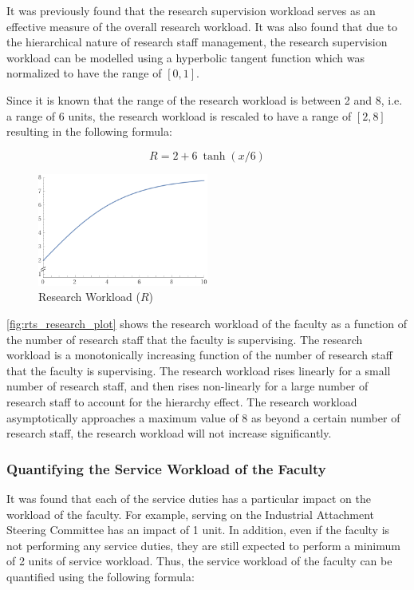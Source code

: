 It was previously found that the research supervision workload serves as an effective measure of the overall research workload. It was also found that due to the hierarchical nature of research staff management, the research supervision workload can be modelled using a hyperbolic tangent function which was normalized to have the range of $[0, 1]$.

Since it is known that the range of the research workload is between 2 and 8, i.e. a range of 6 units, the research workload is rescaled to have a range of $[2, 8]$ resulting in the following formula:

\begin{equation}
  R  = 2 + 6\ \tanh(x/6)
\end{equation}

\begin{figure}[H]
  \includegraphics[width=0.5\textwidth]{images/rts_research_plot.png}
  \centering
  \caption{Research Workload ($R$)}
  \label{fig:rts_research_plot}
\end{figure}

\autoref{fig:rts_research_plot} shows the research workload of the faculty as a function of the number of research staff that the faculty is supervising. The research workload is a monotonically increasing function of the number of research staff that the faculty is supervising. The research workload rises linearly for a small number of research staff, and then rises non-linearly for a large number of research staff to account for the hierarchy effect. The research workload asymptotically approaches a maximum value of 8 as beyond a certain number of research staff, the research workload will not increase significantly.

\subsubsection{Quantifying the Service Workload of the Faculty}

It was found that each of the service duties has a particular impact on the workload of the faculty. For example, serving on the Industrial Attachment Steering Committee has an impact of 1 unit. In addition, even if the faculty is not performing any service duties, they are still expected to perform a minimum of 2 units of service workload. Thus, the service workload of the faculty can be quantified using the following formula:

